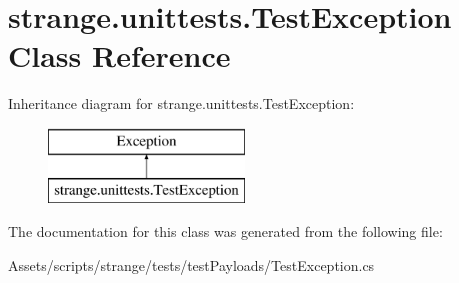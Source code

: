 \hypertarget{classstrange_1_1unittests_1_1_test_exception}{\section{strange.\-unittests.\-Test\-Exception Class Reference}
\label{classstrange_1_1unittests_1_1_test_exception}
}
Inheritance diagram for strange.\-unittests.\-Test\-Exception\-:\begin{figure}[H]
\begin{center}
\leavevmode
\includegraphics[height=2.000000cm]{classstrange_1_1unittests_1_1_test_exception}
\end{center}
\end{figure}


The documentation for this class was generated from the following file\-:\begin{DoxyCompactItemize}
\item 
Assets/scripts/strange/tests/test\-Payloads/Test\-Exception.\-cs\end{DoxyCompactItemize}
